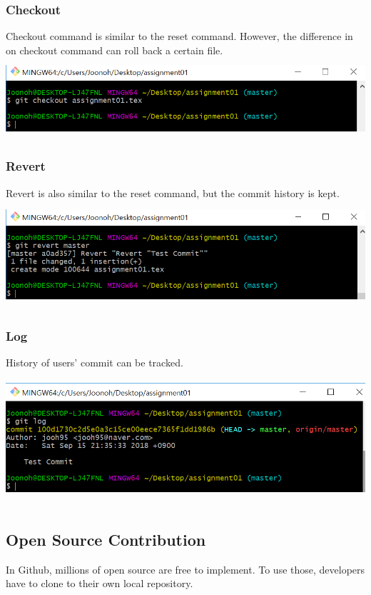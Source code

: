 \documentclass[18pt]{article}%
\begin{document}
\subsubsection {Checkout}
Checkout command is similar to the reset command. However, the difference in on checkout command can roll back a certain file.\\
\includegraphics[height=3cm]{checkout.PNG}

\subsubsection {Revert}
Revert is also similar to the reset command, but the commit history is kept.\\
\includegraphics[height=4cm]{revert.PNG}

\subsubsection {Log}
History of users' commit can be tracked.\\
\includegraphics[height=5cm]{log.PNG}

 
 \subsection {Open Source Contribution}
In Github, millions of open source are free to implement. To use those, developers have to clone to their own local repository.
\end{document}
